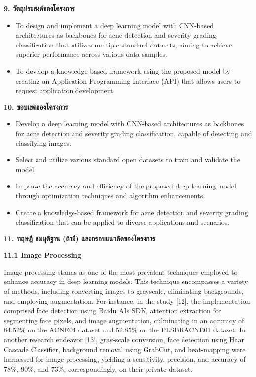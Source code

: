 \documentclass[16pt]{extarticle}
\begin{document}
\textbf{9. วัตถุประสงค์ของโครงการ}

\begin{itemize}
\item
  To design and implement a deep learning model with CNN-based
  architectures as backbones for acne detection and severity grading
  classification that utilizes multiple standard datasets, aiming to
  achieve superior performance across various data samples.
\item
  To develop a knowledge-based framework using the proposed model by
  creating an Application Programming Interface (API) that allows users
  to request application development.
\end{itemize}

\textbf{10. ขอบเขตของโครงการ}

\begin{itemize}
\item
  Develop a deep learning model with CNN-based architectures as
  backbones for acne detection and severity grading classification,
  capable of detecting and classifying images.
\item
  Select and utilize various standard open datasets to train and
  validate the model.
\item
  Improve the accuracy and efficiency of the proposed deep learning
  model through optimization techniques and algorithm enhancements.
\item
  Create a knowledge-based framework for acne detection and severity
  grading classification that can be applied to diverse applications and
  scenarios.
\end{itemize}

\textbf{11. ทฤษฎี สมมุติฐาน (ถ้ามี) และกรอบแนวคิดของโครงการ}

\textbf{11.1 Image Processing}

Image processing stands as one of the most prevalent techniques employed
to enhance accuracy in deep learning models. This technique encompasses
a variety of methods, including converting images to grayscale,
eliminating backgrounds, and employing augmentation. For instance, in
the study {[}12{]}, the implementation comprised face detection using
Baidu AI\textquotesingle s SDK, attention extraction for segmenting face
pixels, and image augmentation, culminating in an accuracy of 84.52\% on
the ACNE04 dataset and 52.85\% on the PLSBRACNE01 dataset. In another
research endeavor {[}13{]}, gray-scale conversion, face detection using
Haar Cascade Classifier, background removal using GrabCut, and
heat-mapping were harnessed for image processing, yielding a
sensitivity, precision, and accuracy of 78\%, 90\%, and 73\%,
correspondingly, on their private dataset.
\end{document}
